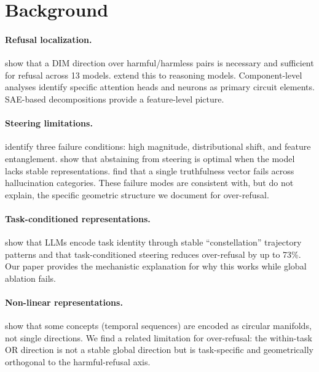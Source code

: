 \documentclass[11pt]{article}
\begin{document}
\section{Background}
\label{sec:background}

\paragraph{Refusal localization.}
\citet{arditi2024refusal} show that a DIM direction over harmful/harmless pairs is
necessary and sufficient for refusal across 13 models. \citet{zhao2025refusal} extend
this to reasoning models. Component-level analyses identify specific attention heads
\citep{zhou2025safety} and neurons \citep{zhao2025d} as primary circuit elements.
SAE-based decompositions \citep{templeton2024scaling,goyal2025detox} provide a
feature-level picture.

\paragraph{Steering limitations.}
\citet{braun2025unreliability} identify three failure conditions: high magnitude,
distributional shift, and feature entanglement. \citet{hedstrom2025steer} show that
abstaining from steering is optimal when the model lacks stable representations.
\citet{wang2025adaptive} find that a single truthfulness vector fails across
hallucination categories. These failure modes are consistent with, but do not explain,
the specific geometric structure we document for over-refusal.

\paragraph{Task-conditioned representations.}
\citet{safeconstellations2025} show that LLMs encode task identity through stable
``constellation'' trajectory patterns and that task-conditioned steering reduces
over-refusal by up to 73\%. Our paper provides the mechanistic explanation for why
this works while global ablation fails.

\paragraph{Non-linear representations.}
\citet{engels2025nonlinear} show that some concepts (temporal sequences) are encoded
as circular manifolds, not single directions. We find a related limitation for
over-refusal: the within-task OR direction is not a stable global direction but is
task-specific and geometrically orthogonal to the harmful-refusal axis.
\end{document}
